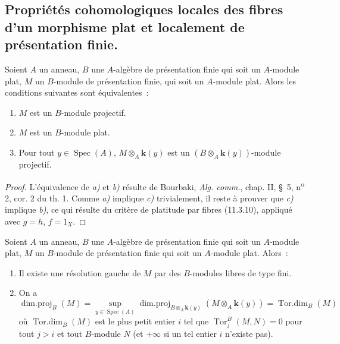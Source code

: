 \subsection{Propriétés cohomologiques locales des fibres d'un morphisme plat et
localement de présentation finie.}
\label{subsection:IV.12.3-fr}

\begin{lemma}[12.3.1]
\label{IV.12.3.1-fr}
Soient $A$ un anneau, $B$ une $A$-algèbre de présentation finie qui soit un
$A$-module plat, $M$ un $B$-module de présentation finie, qui soit un
$A$-module plat. Alors les conditions suivantes sont équivalentes~:
\begin{enumerate}[label=\emph{\alph*)}]
  \item $M$ est un $B$-module projectif.
  \item $M$ est un $B$-module plat.
  \item Pour tout $y\in\operatorname{Spec}(A)$, $M\otimes_A\boldsymbol{k}(y)$ est un
  $(B\otimes_A\boldsymbol{k}(y))$-module projectif.
\end{enumerate}
\end{lemma}

\begin{proof}
L'équivalence de \emph{a)} et \emph{b)} résulte de Bourbaki, \emph{Alg. comm.}, chap. II,
\S~5, n\textsuperscript{o} 2, cor. 2 du th. 1. Comme \emph{a)} implique \emph{c)}
trivialement, il reste à prouver que \emph{c)} implique \emph{b)}, ce qui résulte du
critère de platitude par fibres (11.3.10), appliqué avec $g=h$, $f=1_X$.
\end{proof}

\begin{proposition}[12.3.2]
\label{IV.12.3.2-fr}
Soient $A$ un anneau, $B$ une $A$-algèbre de présentation finie qui soit un
$A$-module plat, $M$ un $B$-module de présentation finie qui soit un
$A$-module plat. Alors~:
\begin{enumerate}[label=\textup{(\roman*)}]
  \item Il existe une résolution gauche de $M$ par des $B$-modules libres de
  type fini.
  \item On a
  \begin{equation}
    \tag{12.3.2.1}
    \label{IV.12.3.2.1-fr}
    \operatorname{dim.proj}_B(M)
    =\sup_{y\in\operatorname{Spec}(A)}
    \operatorname{dim.proj}_{B\otimes_A\mathbf{k}(y)}(M\otimes_A\boldsymbol{k}(y))
    =\operatorname{Tor.dim}_B(M)
  \end{equation}
  où $\operatorname{Tor.dim}_B(M)$ est le plus petit entier $i$ tel que
  $\operatorname{Tor}^B_j(M,N)=0$ pour tout $j>i$ et tout $B$-module $N$
  (et $+\infty$ si un tel entier $i$ n'existe pas).
\end{enumerate}
\end{proposition}

